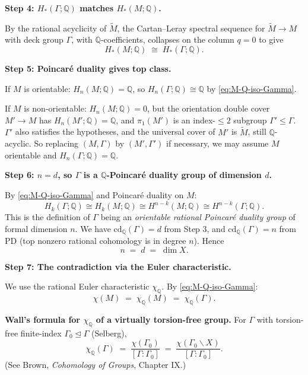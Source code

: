 \medskip
\noindent\textbf{Step 4: $H_*(\Gamma;\mathbb Q)$ matches $H_*(M;\mathbb Q)$.}

By the rational acyclicity of $\widetilde M$, the Cartan--Leray spectral sequence for $\widetilde M\to M$ with deck group $\Gamma$, with $\mathbb Q$-coefficients, collapses on the column $q=0$ to give
\begin{equation}\label{eq:M-Q-iso-Gamma}
H_*(M;\mathbb Q)\;\cong\;H_*(\Gamma;\mathbb Q).
\end{equation}

\medskip
\noindent\textbf{Step 5: Poincaré duality gives top class.}

If $M$ is orientable: $H_n(M;\mathbb Q)=\mathbb Q$, so $H_n(\Gamma;\mathbb Q)\cong\mathbb Q$ by \eqref{eq:M-Q-iso-Gamma}.

If $M$ is non-orientable: $H_n(M;\mathbb Q)=0$, but the orientation double cover $M'\to M$ has $H_n(M';\mathbb Q)=\mathbb Q$, and $\pi_1(M')$ is an index-$\le 2$ subgroup $\Gamma'\le\Gamma$.  $\Gamma'$ also satisfies the hypotheses, and the universal cover of $M'$ is $\widetilde M$, still $\mathbb Q$-acyclic.  So replacing $(M,\Gamma)$ by $(M',\Gamma')$ if necessary, we may assume $M$ orientable and $H_n(\Gamma;\mathbb Q)=\mathbb Q$.

\medskip
\noindent\textbf{Step 6: $n=d$, so $\Gamma$ is a $\mathbb Q$-Poincaré duality group of dimension $d$.}

By \eqref{eq:M-Q-iso-Gamma} and Poincaré duality on $M$:
\[
H_k(\Gamma;\mathbb Q)\cong H_k(M;\mathbb Q)\cong H^{n-k}(M;\mathbb Q)\cong H^{n-k}(\Gamma;\mathbb Q).
\]
This is the definition of $\Gamma$ being an \emph{orientable rational Poincaré duality group} of formal dimension $n$.  We have $\mathrm{cd}_{\mathbb Q}(\Gamma)=d$ from Step 3, and $\mathrm{cd}_{\mathbb Q}(\Gamma)=n$ from PD (top nonzero rational cohomology is in degree $n$).  Hence
\[
n\;=\;d\;=\;\dim X.
\]

\medskip
\noindent\textbf{Step 7: The contradiction via the Euler characteristic.}

We use the rational Euler characteristic $\chi_{\mathbb Q}$.  By \eqref{eq:M-Q-iso-Gamma}:
\[
\chi(M)\;=\;\chi_{\mathbb Q}(M)\;=\;\chi_{\mathbb Q}(\Gamma).
\]

\textbf{Wall's formula for $\chi_{\mathbb Q}$ of a virtually torsion-free group.}  For $\Gamma$ with torsion-free finite-index $\Gamma_0\trianglelefteq\Gamma$ (Selberg),
\begin{equation}\label{eq:Wall}
\chi_{\mathbb Q}(\Gamma)\;=\;\frac{\chi(\Gamma_0)}{[\Gamma:\Gamma_0]}\;=\;\frac{\chi(\Gamma_0\backslash X)}{[\Gamma:\Gamma_0]}.
\end{equation}
(See Brown, \emph{Cohomology of Groups}, Chapter IX.)

